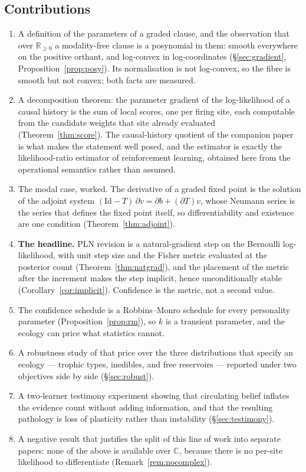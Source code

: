 \documentclass[11pt,a4paper]{article}
\theoremstyle{plain}
\theoremstyle{definition}
\theoremstyle{remark}
\newcommand{\Rnn}{\mathbb{R}_{\geq 0}}
\newcommand{\Cx}{\mathbb{C}}
\begin{document}
\subsection{Contributions}

\begin{enumerate}[leftmargin=1.6em,itemsep=2pt]
\item A definition of the parameters of a graded clause, and the observation that
over $\Rnn$ a modality-free clause is a posynomial in them: smooth everywhere on
the positive orthant, and log-convex in log-coordinates
(\S\ref{sec:gradient}, Proposition~\ref{prop:posy}). Its normalisation is not
log-convex, so the fibre is smooth but not convex; both facts are measured.
\item A decomposition theorem: the parameter gradient of the log-likelihood of a
causal history is the sum of local scores, one per firing site, each computable
from the candidate weights that site already evaluated
(Theorem~\ref{thm:score}). The causal-history quotient of the companion paper is
what makes the statement well posed, and the estimator is exactly the
likelihood-ratio estimator of reinforcement learning, obtained here from the
operational semantics rather than assumed.
\item The modal case, worked. The derivative of a graded fixed point is the
solution of the adjoint system $(\mathrm{Id} - T)\,\partial v = \partial b +
(\partial T) v$, whose Neumann series is the series that defines the fixed point
itself, so differentiability and existence are one condition
(Theorem~\ref{thm:adjoint}).
\item \textbf{The headline.} PLN revision is a natural-gradient step on the
Bernoulli log-likelihood, with unit step size and the Fisher metric evaluated at
the posterior count (Theorem~\ref{thm:natgrad}), and the placement of the metric
after the increment makes the step implicit, hence unconditionally stable
(Corollary~\ref{cor:implicit}). Confidence is the metric, not a second value.
\item The confidence schedule is a Robbins--Monro schedule for every personality
parameter (Proposition~\ref{prop:rm}), so $k$ is a transient parameter, and the
ecology can price what statistics cannot.
\item A robustness study of that price over the three distributions that specify
an ecology --- trophic types, inedibles, and free reservoirs --- reported under
two objectives side by side (\S\ref{sec:robust}).
\item A two-learner testimony experiment showing that circulating belief inflates
the evidence count without adding information, and that the resulting pathology
is loss of plasticity rather than instability (\S\ref{sec:testimony}).
\item A negative result that justifies the split of this line of work into
separate papers: none of the above is available over $\Cx$, because there is no
per-site likelihood to differentiate (Remark~\ref{rem:nocomplex}).
\end{enumerate}
\end{document}
